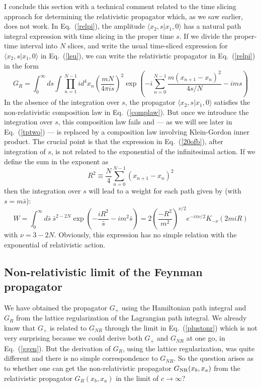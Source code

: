 \documentclass[12pt]{article}
\def\eq#1{{Eq.~(\ref{#1})}}
\def\amp#1#2{\langle #1 | #2\rangle}      %
\begin{document}
I conclude this section with a technical comment related to the time slicing approach for determining the relativistic propagator which, as we saw earlier, does not work. In \eq{relpi}, the amplitude $\amp{x_2,s}{x_1,0}$ has a natural path integral expression with time slicing in the proper time $s$. If we divide the proper-time interval into $N$ slices, and write the usual time-sliced expression for $\amp{x_2,s}{x_1,0}$ in \eq{leu}, we can write  the relativistic propagator in \eq{relpi} in the form
 \begin{equation}
 G_R = \int_0^\infty ds  \int \prod^{N-1}_{n=1} id^4x_n\left(\frac{mN}{4\pi is}\right)^2 \exp\left( -i \sum_{n=0}^{N-1} \frac{m(x_{n+1} - x_n)^2}{4s/N} - i  m s\right)
  \label{20ofb}
 \end{equation} 
 In the absence of the integration over $s$, the propagator $\amp{x_2,s}{x_1,0}$ satisfies the non-relativistic composition law in \eq{complaw}. But once we introduce the integration over $s$, this composition law fails and --- as we will see later in \eq{tptwo} --- is replaced by a composition law involving Klein-Gordon inner product. The crucial point is that the expression in \eq{20ofb}, after integration of $s$, is not related to the exponential of the infinitesimal action. If we define the sum in the exponent as 
 \begin{equation}
  R^2 \equiv \frac{N}{4} \sum_{n=0}^{N-1} (x_{n+1} - x_n)^2
 \end{equation} 
 then the integration over $s$ will lead to a weight for each path given by (with $s=m\bar s$):
 \begin{equation}
 W = \int_0^\infty d\bar s\ \bar s^{2-2N} \exp \left(-\frac{iR^2}{\bar s} - i m^2\bar s \right) 
 = 2\left(\frac{-R^2}{m^2}\right)^{\nu/2}e^{-i\pi\nu/2}K_{-\nu}(2miR)
 \label{notaction}
 \end{equation} 
with $\nu=3-2N$. Obviously, this expression has no simple relation with the exponential of relativistic action. 
 

\subsection{Non-relativistic limit of the Feynman propagator}\label{sec:nroff}

We have obtained the propagator $G_+$ using the Hamiltonian path integral and $G_R$ from the lattice regularization of the Lagrangian path integral. We already know that $G_+$ is related to $G_{NR}$ through the limit in \eq{plustonr} which is not very surprising because we could derive both $G_+$ and $G_{NR}$ at one go, in \eq{ggen}. But the derivation of $G_R$, using the lattice regularization, was quite different and there is no simple correspondence to $G_{NR}$. So the question arises as to whether one can get the non-relativistic propagator $G_{\rm NR}(x_b,x_a)$ from the relativistic propagator $G_{R}(x_b,x_a)$ in the limit of $c\to\infty$? 
\end{document}
